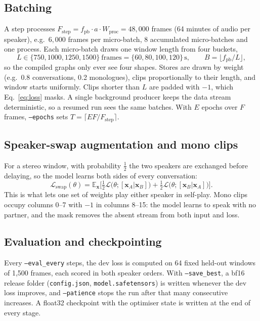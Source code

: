 \documentclass[10pt]{article}
\begin{document}
\subsection{Batching}
A step processes $F_\text{step}=f_\text{pb}\cdot a\cdot W_\text{proc}=48{,}000$ frames (64 minutes of audio per speaker), e.g.\ $6{,}000$ frames per micro-batch, 8 accumulated micro-batches and one process. Each micro-batch draws one window length from four buckets,
\begin{equation}
L\in\{750,1000,1250,1500\}\ \text{frames}=\{60,80,100,120\}\,\text{s},\qquad B=\lfloor f_\text{pb}/L\rfloor,
\end{equation}
so the compiled graphs only ever see four shapes. Stores are drawn by weight (e.g.\ 0.8 conversations, 0.2 monologues), clips proportionally to their length, and window starts uniformly. Clips shorter than $L$ are padded with $-1$, which Eq.~\eqref{eq:loss} masks. A single background producer keeps the data stream deterministic, so a resumed run sees the same batches. With $E$ epochs over $F$ frames, \texttt{--epochs} sets $T=\lceil EF/F_\text{step}\rceil$.

\subsection{Speaker-swap augmentation and mono clips}
For a stereo window, with probability $\frac12$ the two speakers are exchanged before delaying, so the model learns both sides of every conversation:
\begin{equation}
\mathcal{L}_\text{swap}(\theta)=\mathbb{E}_{\mathbf{x}}\Big[\tfrac12\mathcal{L}\big(\theta;[\mathbf{x}_A|\mathbf{x}_B]\big)+\tfrac12\mathcal{L}\big(\theta;[\mathbf{x}_B|\mathbf{x}_A]\big)\Big].
\label{eq:swap}
\end{equation}
This is what lets one set of weights play either speaker in self-play. Mono clips occupy columns 0--7 with $-1$ in columns 8--15: the model learns to speak with no partner, and the mask removes the absent stream from both input and loss.

\subsection{Evaluation and checkpointing}
Every \texttt{--eval\_every} steps, the dev loss is computed on 64 fixed held-out windows of 1{,}500 frames, each scored in both speaker orders. With \texttt{--save\_best}, a bf16 release folder (\texttt{config.json}, \texttt{model.safetensors}) is written whenever the dev loss improves, and \texttt{--patience} stops the run after that many consecutive increases. A float32 checkpoint with the optimiser state is written at the end of every stage.
\end{document}

